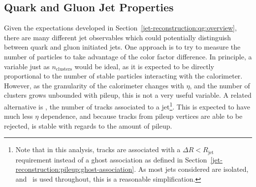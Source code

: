 

\subsection{Quark and Gluon Jet Properties}
\label{jet-reconstruction:qg:properties}

Given the expectations developed in Section~\ref{jet-reconstruction:qg:overview}, there are many different jet observables which could potentially distinguish between quark and gluon initiated jets. One approach is to try to measure the number of particles to take advantage of the color factor difference. In principle, a variable just as $n_\mathrm{clusters}$ would be ideal, as it is expected to be directly proportional to the number of stable particles interacting with the calorimeter. However, as the granularity of the calorimeter changes with $\eta$, and the number of clusters grows unbounded with pileup, this is not a very useful variable. A related alternative is \ntrk, the number of tracks associated to a jet\footnote{Note that in this analysis, tracks are associated with a $\Delta R < R_\mathrm{jet}$ requirement instead of a ghost association as defined in Section~\ref{jet-reconstruction:pileup:ghost-association}. As most jets considered are isolated, and \antikt~is used throughout, this is a reasonable simplification.}. This is expected to have much less $\eta$ dependence, and because tracks from pileup vertices are able to be rejected, is stable with regards to the amount of pileup.

